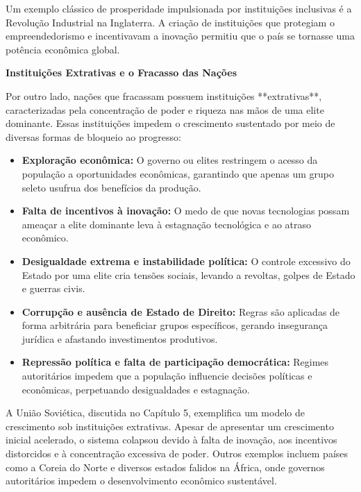 \documentclass[a4paper,12pt]{article}[abntex2]
\begin{document}
Um exemplo clássico de prosperidade impulsionada por instituições inclusivas é a Revolução Industrial na Inglaterra. A criação de instituições que protegiam o empreendedorismo e incentivavam a inovação permitiu que o país se tornasse uma potência econômica global.

\textbf{Instituições Extrativas e o Fracasso das Nações}

Por outro lado, nações que fracassam possuem instituições **extrativas**, caracterizadas pela concentração de poder e riqueza nas mãos de uma elite dominante. Essas instituições impedem o crescimento sustentado por meio de diversas formas de bloqueio ao progresso:

\begin{itemize}
    \item \textbf{Exploração econômica:} O governo ou elites restringem o acesso da população a oportunidades econômicas, garantindo que apenas um grupo seleto usufrua dos benefícios da produção.
    
    \item \textbf{Falta de incentivos à inovação:} O medo de que novas tecnologias possam ameaçar a elite dominante leva à estagnação tecnológica e ao atraso econômico.
    
    \item \textbf{Desigualdade extrema e instabilidade política:} O controle excessivo do Estado por uma elite cria tensões sociais, levando a revoltas, golpes de Estado e guerras civis.
    
    \item \textbf{Corrupção e ausência de Estado de Direito:} Regras são aplicadas de forma arbitrária para beneficiar grupos específicos, gerando insegurança jurídica e afastando investimentos produtivos.
    
    \item \textbf{Repressão política e falta de participação democrática:} Regimes autoritários impedem que a população influencie decisões políticas e econômicas, perpetuando desigualdades e estagnação.
\end{itemize}

A União Soviética, discutida no Capítulo 5, exemplifica um modelo de crescimento sob instituições extrativas. Apesar de apresentar um crescimento inicial acelerado, o sistema colapsou devido à falta de inovação, aos incentivos distorcidos e à concentração excessiva de poder. Outros exemplos incluem países como a Coreia do Norte e diversos estados falidos na África, onde governos autoritários impedem o desenvolvimento econômico sustentável.
\end{document}

